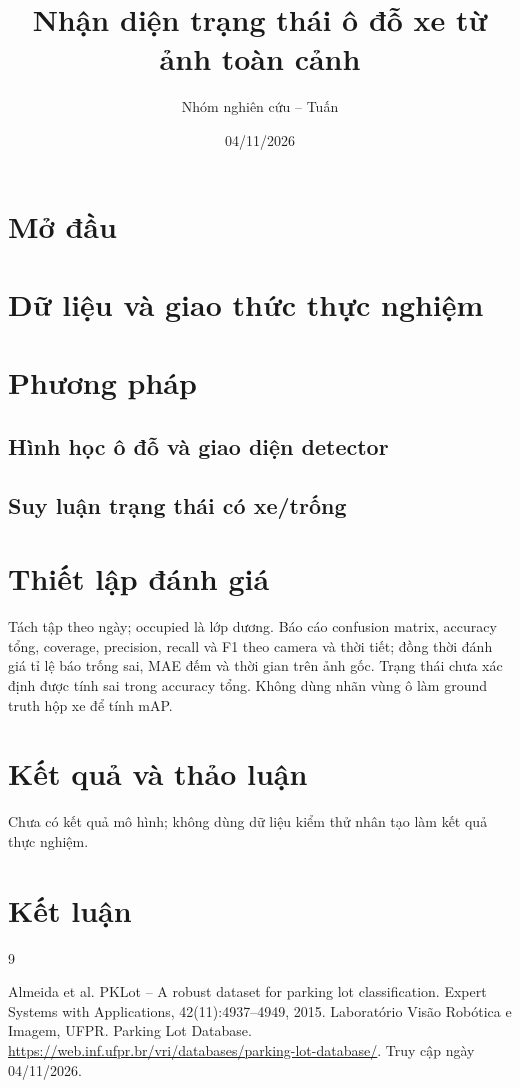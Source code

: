 \documentclass[12pt]{article}
\title{Nhận diện trạng thái ô đỗ xe từ ảnh toàn cảnh}
\author{Nhóm nghiên cứu -- Tuấn}
\date{04/11/2026}
\begin{document}
\maketitle
\section{Mở đầu}

\section{Dữ liệu và giao thức thực nghiệm}

\section{Phương pháp}
\subsection{Hình học ô đỗ và giao diện detector}
\subsection{Suy luận trạng thái có xe/trống}
\section{Thiết lập đánh giá}
Tách tập theo ngày; occupied là lớp dương. Báo cáo confusion matrix,
accuracy tổng, coverage, precision, recall và F1 theo camera và thời tiết;
đồng thời đánh giá tỉ lệ báo trống sai, MAE đếm và thời gian trên ảnh gốc.
Trạng thái chưa xác định được tính sai trong accuracy tổng.
Không dùng nhãn vùng ô làm ground truth hộp xe để tính mAP.
\section{Kết quả và thảo luận}
Chưa có kết quả mô hình; không dùng dữ liệu kiểm thử nhân tạo làm kết quả thực nghiệm.
\section{Kết luận}
\begin{thebibliography}{9}
\raggedright
{} Almeida et al. PKLot -- A robust dataset for parking lot classification.
Expert Systems with Applications, 42(11):4937--4949, 2015.
 Laboratório Visão Robótica e Imagem, UFPR.
Parking Lot Database. \url{https://web.inf.ufpr.br/vri/databases/parking-lot-database/}.
Truy cập ngày 04/11/2026.
\end{thebibliography}
\end{document}
